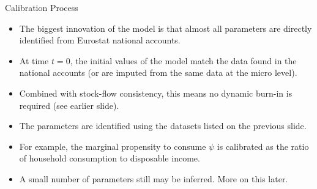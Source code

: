 \documentclass[9pt]{beamer}
\begin{document}
\begin{frame}{Calibration Process}
    \begin{itemize}
        \item The biggest innovation of the model is that almost all parameters are directly identified from Eurostat national accounts.
        \item At time $t = 0$, the initial values of the model match the data found in the national accounts (or are imputed from the same data at the micro level).
        \item Combined with stock-flow consistency, this means no dynamic burn-in is required (see earlier slide).
        \item The parameters are identified using the datasets listed on the previous slide.
        \item For example, the marginal propensity to consume $\psi$ is calibrated as the ratio of household consumption to disposable income.
        \item A small number of parameters still may be inferred. More on this later.
    \end{itemize}
\end{frame}
\end{document}
